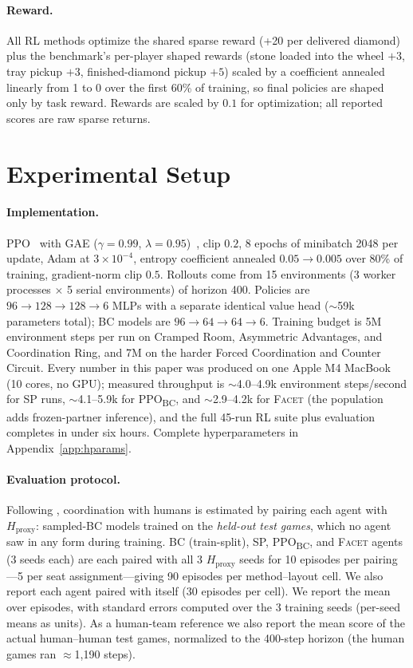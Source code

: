 \documentclass[11pt]{article}
\newcommand{\facet}{\textsc{Facet}}
\newcommand{\hproxy}{$H_{\text{proxy}}$}
\newcommand{\ppobc}{PPO\textsubscript{BC}}
\begin{document}
\paragraph{Reward.}
All RL methods optimize the shared sparse reward (+20 per delivered
diamond) plus the benchmark's per-player shaped rewards (stone loaded into
the wheel $+3$, tray pickup $+3$, finished-diamond pickup $+5$) scaled by
a coefficient annealed linearly
from 1 to 0 over the first 60\% of training, so final policies are shaped
only by task reward. Rewards are scaled by $0.1$ for optimization;
all reported scores are raw sparse returns.

\section{Experimental Setup}
\label{sec:setup}

\paragraph{Implementation.}
PPO~\citep{schulman2017proximal} with GAE
($\gamma=0.99$, $\lambda=0.95$)~\citep{schulman2016gae}, clip $0.2$,
8 epochs of minibatch 2048 per update, Adam at $3{\times}10^{-4}$, entropy
coefficient annealed $0.05\!\to\!0.005$ over 80\% of training, gradient-norm
clip $0.5$. Rollouts come from 15 environments (3 worker processes
$\times$ 5 serial environments) of horizon 400. Policies are
$96\!\to\!128\!\to\!128\!\to\!6$ MLPs with a separate identical value head
($\sim$59k parameters total); BC models are
$96\!\to\!64\!\to\!64\!\to\!6$. Training budget is 5M environment steps
per run on Cramped Room, Asymmetric Advantages, and Coordination Ring, and
7M on the harder Forced Coordination and Counter Circuit. Every number in
this paper was produced on one Apple M4 MacBook (10 cores, no GPU);
measured throughput is $\sim$4.0--4.9k environment steps/second for SP
runs, $\sim$4.1--5.9k for \ppobc{}, and $\sim$2.9--4.2k for \facet{}
(the population adds frozen-partner inference), and the full 45-run RL
suite plus evaluation completes in under six hours. Complete
hyperparameters in Appendix~\ref{app:hparams}.

\paragraph{Evaluation protocol.}
Following \citet{carroll2019utility}, coordination with humans is estimated
by pairing each agent with \hproxy{}: sampled-BC models trained on the
\emph{held-out test games}, which no agent saw in any form during training.
BC (train-split), SP, \ppobc{}, and \facet{} agents (3 seeds each) are each
paired with all 3 \hproxy{} seeds for 10 episodes per pairing---5 per
seat assignment---giving 90 episodes per method--layout cell. We also
report each agent paired with itself (30 episodes per cell). We report the
mean over episodes, with standard errors computed over the 3 training seeds
(per-seed means as units). As a human-team reference we also report the
mean score of the actual human--human test games, normalized to the
400-step horizon (the human games ran $\approx$1{,}190 steps).
\end{document}
